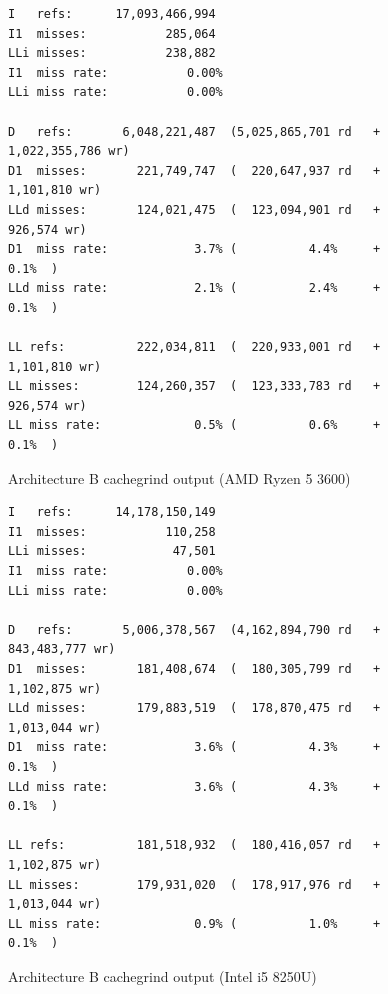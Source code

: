 \documentclass{article}
\begin{document}
\begin{figure}[!h]
\centering
\begin{BVerbatim}
I   refs:      17,093,466,994
I1  misses:           285,064
LLi misses:           238,882
I1  miss rate:           0.00%
LLi miss rate:           0.00%

D   refs:       6,048,221,487  (5,025,865,701 rd   + 1,022,355,786 wr)
D1  misses:       221,749,747  (  220,647,937 rd   +     1,101,810 wr)
LLd misses:       124,021,475  (  123,094,901 rd   +       926,574 wr)
D1  miss rate:            3.7% (          4.4%     +           0.1%  )
LLd miss rate:            2.1% (          2.4%     +           0.1%  )

LL refs:          222,034,811  (  220,933,001 rd   +     1,101,810 wr)
LL misses:        124,260,357  (  123,333,783 rd   +       926,574 wr)
LL miss rate:             0.5% (          0.6%     +           0.1%  )
\end{BVerbatim}
\caption{Architecture B cachegrind output (AMD Ryzen 5 3600)}
\label{arch_b_cachegrind_pc}
\end{figure}

\begin{figure}[!h]
\centering
\begin{BVerbatim}
I   refs:      14,178,150,149
I1  misses:           110,258
LLi misses:            47,501
I1  miss rate:           0.00%
LLi miss rate:           0.00%

D   refs:       5,006,378,567  (4,162,894,790 rd   + 843,483,777 wr)
D1  misses:       181,408,674  (  180,305,799 rd   +   1,102,875 wr)
LLd misses:       179,883,519  (  178,870,475 rd   +   1,013,044 wr)
D1  miss rate:            3.6% (          4.3%     +         0.1%  )
LLd miss rate:            3.6% (          4.3%     +         0.1%  )

LL refs:          181,518,932  (  180,416,057 rd   +   1,102,875 wr)
LL misses:        179,931,020  (  178,917,976 rd   +   1,013,044 wr)
LL miss rate:             0.9% (          1.0%     +         0.1%  )
\end{BVerbatim}
\caption{Architecture B cachegrind output (Intel i5 8250U)}
\label{arch_b_cachegrind_laptop}
\end{figure}
\end{document}
